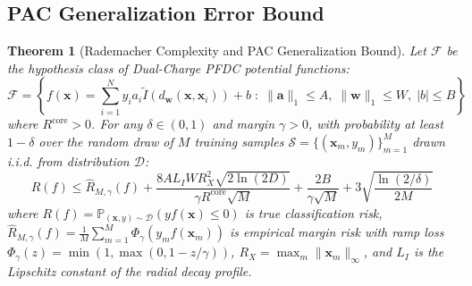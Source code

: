 \documentclass[times, review, 10pt]{elsarticle}
\newtheorem{theorem}{Theorem}
\begin{document}
\subsection{PAC Generalization Error Bound}
\begin{theorem}[Rademacher Complexity and PAC Generalization Bound]
\label{thm:rademacher}
Let $\mathcal{F}$ be the hypothesis class of Dual-Charge PFDC potential functions:
\begin{equation}
\mathcal{F} = \left\{ f(\mathbf{x}) = \sum_{i=1}^N y_i a_i \tilde{I}(d_{\mathbf{w}}(\mathbf{x}, \mathbf{x}_i)) + b \;:\; \|\mathbf{a}\|_1 \le A, \; \|\mathbf{w}\|_1 \le W, \; |b| \le B \right\}
\end{equation}
where $R^{\mathrm{core}} > 0$. For any $\delta \in (0, 1)$ and margin $\gamma > 0$, with probability at least $1 - \delta$ over the random draw of $M$ training samples $\mathcal{S} = \{(\mathbf{x}_m, y_m)\}_{m=1}^M$ drawn i.i.d. from distribution $\mathcal{D}$:
\begin{equation}
R(f) \le \hat{R}_{M,\gamma}(f) + \frac{8 A L_I W R_X^2 \sqrt{2 \ln(2D)}}{\gamma R^{\mathrm{core}} \sqrt{M}} + \frac{2 B}{\gamma \sqrt{M}} + 3 \sqrt{\frac{\ln(2/\delta)}{2M}}
\label{eq:pac_bound}
\end{equation}
where $R(f) = \mathbb{P}_{(\mathbf{x},y)\sim \mathcal{D}}(y f(\mathbf{x}) \le 0)$ is true classification risk, $\hat{R}_{M,\gamma}(f) = \frac{1}{M}\sum_{m=1}^M \Phi_\gamma(y_m f(\mathbf{x}_m))$ is empirical margin risk with ramp loss $\Phi_\gamma(z) = \min(1, \max(0, 1 - z/\gamma))$, $R_X = \max_m \|\mathbf{x}_m\|_\infty$, and $L_I$ is the Lipschitz constant of the radial decay profile.
\end{theorem}
\end{document}
